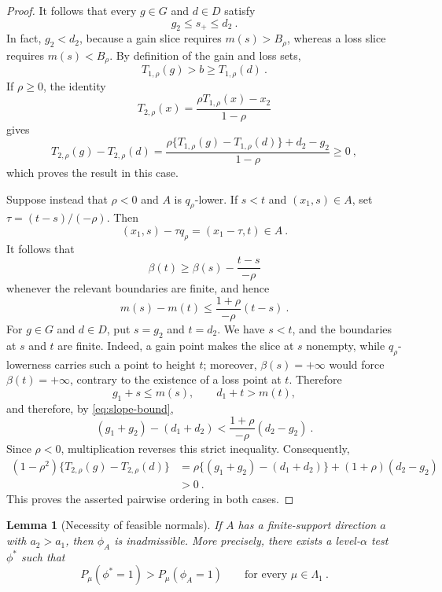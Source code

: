 \documentclass[12pt]{article}
\newtheorem{lemma}{Lemma}
\theoremstyle{remark}
\begin{document}
\begin{proof}
It follows that every $g\in G$ and $d\in D$ satisfy
\[
g_2\le s_+\le d_2~.
\]
In fact, $g_2<d_2$, because a gain slice requires $m(s)>B_\rho$, whereas a
loss slice requires $m(s)<B_\rho$.
By definition of the gain and loss sets,
\[
T_{1,\rho}(g)>b\ge T_{1,\rho}(d)~.
\]
If $\rho\ge0$, the identity
\[
T_{2,\rho}(x)
=\frac{\rho T_{1,\rho}(x)-x_2}{1-\rho}
\]
gives
\[
T_{2,\rho}(g)-T_{2,\rho}(d)
=
\frac{
\rho\{T_{1,\rho}(g)-T_{1,\rho}(d)\}+d_2-g_2
}{1-\rho}
\ge0~,
\]
which proves the result in this case.

Suppose instead that $\rho<0$ and $A$ is $q_\rho$-lower.  If $s<t$ and
$(x_1,s)\in A$, set $\tau=(t-s)/(-\rho)$.  Then
\[
(x_1,s)-\tau q_\rho=(x_1-\tau,t)\in A~.
\]
It follows that
\[
\beta(t)\ge\beta(s)-\frac{t-s}{-\rho}
\]
whenever the relevant boundaries are finite, and hence
\begin{equation}\label{eq:slope-bound}
m(s)-m(t)
\le
\frac{1+\rho}{-\rho}(t-s)~.
\end{equation}
For $g\in G$ and $d\in D$, put $s=g_2$ and $t=d_2$.  We have $s<t$,
and the boundaries at $s$ and $t$ are finite.  Indeed, a gain point makes the
slice at $s$ nonempty, while $q_\rho$-lowerness carries such a point to height
$t$; moreover, $\beta(s)=+\infty$ would force $\beta(t)=+\infty$, contrary to
the existence of a loss point at $t$.  Therefore
\[
g_1+s\le m(s),
\qquad
d_1+t>m(t),
\]
and therefore, by \eqref{eq:slope-bound},
\[
(g_1+g_2)-(d_1+d_2)
<\frac{1+\rho}{-\rho}(d_2-g_2)~.
\]
Since $\rho<0$, multiplication reverses this strict inequality.  Consequently,
\begin{align*}
(1-\rho^2)\{T_{2,\rho}(g)-T_{2,\rho}(d)\}
&=\rho\{(g_1+g_2)-(d_1+d_2)\}
 +(1+\rho)(d_2-g_2)\\
&>0~.
\end{align*}
This proves the asserted pairwise ordering in both cases.
\end{proof}

\begin{lemma}[Necessity of feasible normals]\label{lem:necessity}
If $A$ has a finite-support direction $a$ with $a_2>a_1$, then $\phi_A$ is
inadmissible.  More precisely, there exists a level-$\alpha$ test $\phi^*$
such that
\[
P_\mu(\phi^*=1)>P_\mu(\phi_A=1)
\qquad\text{for every }\mu\in\Lambda_1~.
\]
\end{lemma}
\end{document}
